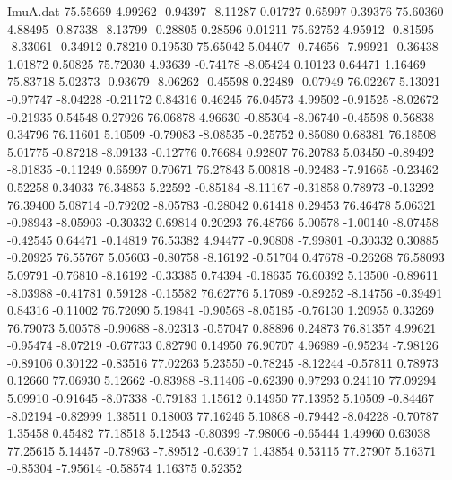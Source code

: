 \begin{filecontents}{ImuA.dat}
  75.55669    4.99262   -0.94397   -8.11287    0.01727    0.65997    0.39376
  75.60360    4.88495   -0.87338   -8.13799   -0.28805    0.28596    0.01211
  75.62752    4.95912   -0.81595   -8.33061   -0.34912    0.78210    0.19530
  75.65042    5.04407   -0.74656   -7.99921   -0.36438    1.01872    0.50825
  75.72030    4.93639   -0.74178   -8.05424    0.10123    0.64471    1.16469
  75.83718    5.02373   -0.93679   -8.06262   -0.45598    0.22489   -0.07949
  76.02267    5.13021   -0.97747   -8.04228   -0.21172    0.84316    0.46245
  76.04573    4.99502   -0.91525   -8.02672   -0.21935    0.54548    0.27926
  76.06878    4.96630   -0.85304   -8.06740   -0.45598    0.56838    0.34796
  76.11601    5.10509   -0.79083   -8.08535   -0.25752    0.85080    0.68381
  76.18508    5.01775   -0.87218   -8.09133   -0.12776    0.76684    0.92807
  76.20783    5.03450   -0.89492   -8.01835   -0.11249    0.65997    0.70671
  76.27843    5.00818   -0.92483   -7.91665   -0.23462    0.52258    0.34033
  76.34853    5.22592   -0.85184   -8.11167   -0.31858    0.78973   -0.13292
  76.39400    5.08714   -0.79202   -8.05783   -0.28042    0.61418    0.29453
  76.46478    5.06321   -0.98943   -8.05903   -0.30332    0.69814    0.20293
  76.48766    5.00578   -1.00140   -8.07458   -0.42545    0.64471   -0.14819
  76.53382    4.94477   -0.90808   -7.99801   -0.30332    0.30885   -0.20925
  76.55767    5.05603   -0.80758   -8.16192   -0.51704    0.47678   -0.26268
  76.58093    5.09791   -0.76810   -8.16192   -0.33385    0.74394   -0.18635
  76.60392    5.13500   -0.89611   -8.03988   -0.41781    0.59128   -0.15582
  76.62776    5.17089   -0.89252   -8.14756   -0.39491    0.84316   -0.11002
  76.72090    5.19841   -0.90568   -8.05185   -0.76130    1.20955    0.33269
  76.79073    5.00578   -0.90688   -8.02313   -0.57047    0.88896    0.24873
  76.81357    4.99621   -0.95474   -8.07219   -0.67733    0.82790    0.14950
  76.90707    4.96989   -0.95234   -7.98126   -0.89106    0.30122   -0.83516
  77.02263    5.23550   -0.78245   -8.12244   -0.57811    0.78973    0.12660
  77.06930    5.12662   -0.83988   -8.11406   -0.62390    0.97293    0.24110
  77.09294    5.09910   -0.91645   -8.07338   -0.79183    1.15612    0.14950
  77.13952    5.10509   -0.84467   -8.02194   -0.82999    1.38511    0.18003
  77.16246    5.10868   -0.79442   -8.04228   -0.70787    1.35458    0.45482
  77.18518    5.12543   -0.80399   -7.98006   -0.65444    1.49960    0.63038
  77.25615    5.14457   -0.78963   -7.89512   -0.63917    1.43854    0.53115
  77.27907    5.16371   -0.85304   -7.95614   -0.58574    1.16375    0.52352

\end{filecontents}
